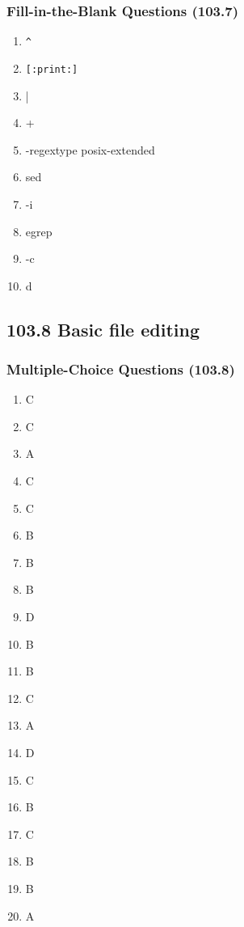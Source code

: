 \documentclass[a4paper]{report}
\begin{document}
\subsubsection*{Fill-in-the-Blank Questions (103.7)}
\begin{enumerate}[1.]
    \item \texttt{\^}
    \item \texttt{[:print:]}
    \item |
    \item +
    \item -regextype posix-extended
    \item sed
    \item -i
    \item egrep
    \item -c
    \item d
\end{enumerate}
\subsection*{103.8 Basic file editing}
\subsubsection*{Multiple-Choice Questions (103.8)}
\begin{enumerate}[1.]
    \item C
    \item C
    \item A
    \item C
    \item C
    \item B
    \item B
    \item B
    \item D
    \item B
    \item B
    \item C
    \item A
    \item D
    \item C
    \item B
    \item C
    \item B
    \item B
    \item A
\end{enumerate}
\end{document}
